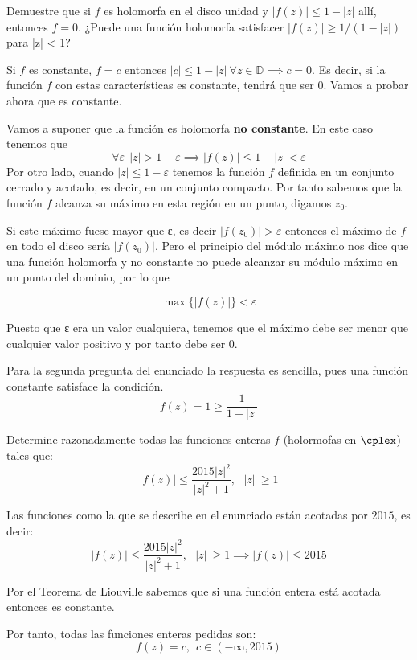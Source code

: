 \begin{problem}[7]
Demuestre que si $f$ es holomorfa en el disco unidad y $|f(z)|\leq 1-|z|$ allí, entonces $f=0$. ¿Puede una función holomorfa satisfacer $|f(z)| \geq 1/(1-|z|)$ para |z| < 1?
\solution


Si $f$ es constante, $f=c$ entonces $|c| \leq 1-|z| \ \forall z \in \mathbb{D} \implies c=0$. Es decir, si la función $f$ con estas características es constante, tendrá que ser 0. Vamos a probar ahora que es constante.

Vamos a suponer que la función es holomorfa \textbf{no constante}. En este caso tenemos que
\[\forall ε \ \ |z|>1-ε \implies |f(z)| \leq 1-|z| < ε\]
Por otro lado, cuando $|z|\leq 1-ε$ tenemos la función $f$ definida en un conjunto cerrado y acotado, es decir, en un conjunto compacto. Por tanto sabemos que la función $f$ alcanza su máximo en esta región en un punto, digamos $z_0$.

Si este máximo fuese mayor que ε, es decir $|f(z_0)|>ε$ entonces el máximo de $f$ en todo el disco sería $|f(z_0)|$. Pero el principio del módulo máximo nos dice que una función holomorfa y no constante no puede alcanzar su módulo máximo en un punto del dominio, por lo que

\[\max\{|f(z)|\}<ε\]

Puesto que ε era un valor cualquiera, tenemos que el máximo debe ser menor que cualquier valor positivo y por tanto debe ser 0.

Para la segunda pregunta del enunciado la respuesta es sencilla, pues una función constante satisface la condición.
\[f(z)=1\geq \frac{1}{1-|z|}\]
\end{problem}

\begin{problem}[8]
Determine razonadamente todas las funciones enteras $f$ (holormofas en $\cplex$) tales que:
\[|f(z)| \leq \frac{2015|z|^2}{|z|^2+1}, \ \ \ |z|\ \geq 1\]
\solution
{}

Las funciones como la que se describe en el enunciado están acotadas por $2015$, es decir:
\[|f(z)| \leq \frac{2015|z|^2}{|z|^2+1}, \ \ \ |z|\ \geq 1 \implies |f(z)| \leq 2015\]

Por el Teorema de Liouville sabemos que si una función entera está acotada entonces es constante.

Por tanto, todas las funciones enteras pedidas son:
\[f(z)=c, \ \ c \in (-\infty,2015)\]
\end{problem}

